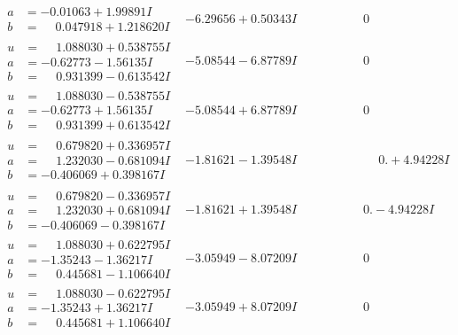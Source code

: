 \documentclass[1p]{elsarticle_modified}
\theoremstyle{definition}
\begin{document}
$$\begin{array}{c|c|c}
\begin{aligned}
a &= -0.01063 + 1.99891 I \\
b &= \phantom{-}0.047918 + 1.218620 I\end{aligned}
 & -6.29656 + 0.50343 I & \phantom{-0.000000 } 0 \\ \hline\begin{aligned}
u &= \phantom{-}1.088030 + 0.538755 I \\
a &= -0.62773 - 1.56135 I \\
b &= \phantom{-}0.931399 - 0.613542 I\end{aligned}
 & -5.08544 - 6.87789 I & \phantom{-0.000000 } 0 \\ \hline\begin{aligned}
u &= \phantom{-}1.088030 - 0.538755 I \\
a &= -0.62773 + 1.56135 I \\
b &= \phantom{-}0.931399 + 0.613542 I\end{aligned}
 & -5.08544 + 6.87789 I & \phantom{-0.000000 } 0 \\ \hline\begin{aligned}
u &= \phantom{-}0.679820 + 0.336957 I \\
a &= \phantom{-}1.232030 - 0.681094 I \\
b &= -0.406069 + 0.398167 I\end{aligned}
 & -1.81621 - 1.39548 I & \phantom{-0.000000 -}0. + 4.94228 I \\ \hline\begin{aligned}
u &= \phantom{-}0.679820 - 0.336957 I \\
a &= \phantom{-}1.232030 + 0.681094 I \\
b &= -0.406069 - 0.398167 I\end{aligned}
 & -1.81621 + 1.39548 I & \phantom{-0.000000 } 0. - 4.94228 I \\ \hline\begin{aligned}
u &= \phantom{-}1.088030 + 0.622795 I \\
a &= -1.35243 - 1.36217 I \\
b &= \phantom{-}0.445681 - 1.106640 I\end{aligned}
 & -3.05949 - 8.07209 I & \phantom{-0.000000 } 0 \\ \hline\begin{aligned}
u &= \phantom{-}1.088030 - 0.622795 I \\
a &= -1.35243 + 1.36217 I \\
b &= \phantom{-}0.445681 + 1.106640 I\end{aligned}
 & -3.05949 + 8.07209 I & \phantom{-0.000000 } 0 \\ \hline\begin{aligned}

\end{aligned}
\end{array}$$
\end{document}
